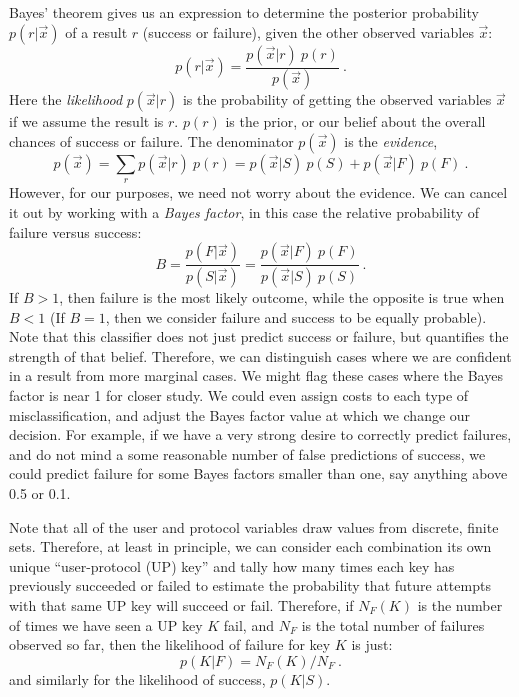 \documentclass[aps, prd, amsmath, floats, floatfix, superscriptaddress,
nofootinbib,eqsecnum]{revtex4}
\begin{document}
Bayes' theorem gives us an expression to determine the posterior probability $p(r | \vec{x} )$ of a result $r$ (success or failure),
given the other observed variables $\vec{x}$:
\begin{equation}
p(r | \vec{x}) = \frac{ p(\vec{x} | r)\ p(r) }{p(\vec{x})} \ .
\end{equation}
Here the \emph{likelihood} $p(\vec{x} | r)$ is the probability of getting the observed variables $\vec{x}$ 
if we assume the result is $r$. $p(r)$ is the prior, or our belief about the overall chances of success or failure.
The denominator $p(\vec{x})$ is the \emph{evidence},
\begin{equation}
p(\vec{x}) = \sum_r p(\vec{x} | r) \ p(r) = p(\vec{x} | S) \ p(S) + p(\vec{x} | F) \ p(F)\ .
\end{equation}
However, for our purposes, we need not worry about the evidence. We can cancel it out by working with a
\emph{Bayes factor}, in this case the relative probability of failure versus success:
\begin{equation}
B = \frac{p(F | \vec{x})}{p(S | \vec{x})} = \frac{p(\vec{x}|F) \ p(F)}{p(\vec{x} | S) \ p(S)}\ .
\end{equation}
If $B > 1$, then failure is the most likely outcome, while the opposite is true when $B < 1$ (If $B=1$,
then we consider failure and success to be equally probable). Note that this classifier does not just predict success or failure,
but quantifies the strength of that belief. Therefore, we can distinguish cases where we are confident in a result
from more marginal cases. We might flag these cases where the Bayes factor is near 1 for closer study.
We could even assign costs to each type of misclassification, and adjust the Bayes factor value
at which we change our decision. For example, if we have a very strong desire to correctly predict failures, and
do not mind a some reasonable number of false predictions of success, we could predict failure for some
Bayes factors smaller than one, say anything above 0.5 or 0.1.

Note that all of the user and protocol variables draw values from discrete, finite sets.
Therefore, at least in principle, we can consider each combination
its own unique ``user-protocol (UP) key'' and tally how many times each key has previously
succeeded or failed to estimate the probability that future attempts with that same UP key will succeed or fail.
Therefore, if $N_F(K)$ is the number of times we have seen a UP key $K$ fail, and $N_F$ is the
total number of failures observed so far, then the likelihood of failure for key $K$ is just:
\begin{equation} \label{eq:LR}
p(K|F) = N_F(K) / N_F\ .
\end{equation}
and similarly for the likelihood of success, $p(K|S)$.
\end{document}
